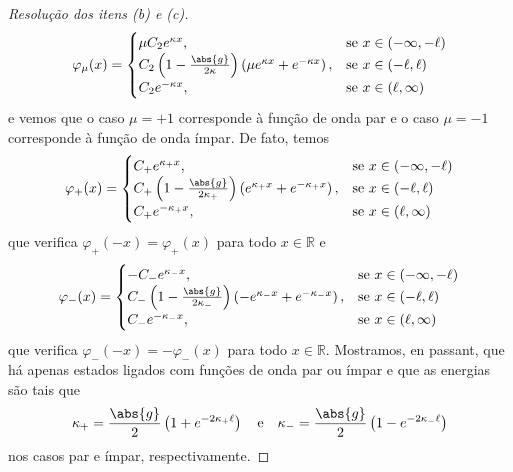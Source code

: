 \begin{proof}[Resolução dos itens (b) e (c)]
\begin{equation*}
        \varphi_\mu(x) = \begin{cases}
            \mu C_2 e^{\kappa x},&\text{se }x \in (-\infty, -\ell)\\
            C_2\left(1 - \frac{\abs{g}}{2\kappa}\right)\left(\mu e^{\kappa x} + e^{-\kappa x}\right),&\text{se }x \in (-\ell, \ell)\\
            C_2 e^{-\kappa x},&\text{se }x \in (\ell, \infty)
        \end{cases}
    \end{equation*}
    e vemos que o caso \(\mu = +1\) corresponde à função de onda par e o caso \(\mu = -1\) corresponde à função de onda ímpar. De fato, temos
    \begin{equation*}
        \varphi_+(x) = \begin{cases}
            C_+e^{\kappa_+ x},&\text{se }x \in (-\infty, -\ell)\\
            C_+\left(1 - \frac{\abs{g}}{2\kappa_+}\right)\left(e^{\kappa_+ x} + e^{-\kappa_+ x}\right),&\text{se }x \in (-\ell, \ell)\\
            C_+e^{-\kappa_+ x},&\text{se }x \in (\ell, \infty)
        \end{cases}
    \end{equation*}
    que verifica \(\varphi_+(-x) = \varphi_+(x)\) para todo \(x \in \mathbb{R}\) e
    \begin{equation*}
        \varphi_-(x) = \begin{cases}
            -C_-e^{\kappa_- x},&\text{se }x \in (-\infty, -\ell)\\
            C_-\left(1 - \frac{\abs{g}}{2\kappa_-}\right)\left(-e^{\kappa_- x} + e^{-\kappa_- x}\right),&\text{se }x \in (-\ell, \ell)\\
            C_-e^{-\kappa_- x},&\text{se }x \in (\ell, \infty)
        \end{cases}
    \end{equation*}
    que verifica \(\varphi_-(-x) = -\varphi_-(x)\) para todo \(x \in \mathbb{R}\). Mostramos, en passant, que há apenas estados ligados com funções de onda par ou ímpar e que as energias são tais que
    \begin{equation*}
        \kappa_+ = \frac{\abs{g}}{2} \left(1 + e^{-2\kappa_+ \ell}\right)
        \quad\text{e}\quad
        \kappa_- = \frac{\abs{g}}{2} \left(1 - e^{-2\kappa_- \ell}\right)
    \end{equation*}
    nos casos par e ímpar, respectivamente.


\end{proof}
